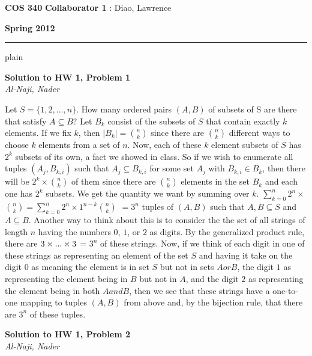 \documentclass[12pt]{article}
\newcommand{\myheader}[4]
{\vspace*{-0.5in}
\noindent
{#1} \hfill {#3}

\noindent
{#2} \hfill {#4}

\noindent
\rule[8pt]{\textwidth}{1pt}

\vspace{1ex} 
}  %
\newcommand{\myalgsheader}[0]
{\myheader
{ {\bf{COS 340}} }
{ {\bf{Spring 2012}} }
{ {\bf{Collaborator 1}} : Diao, Lawrence }
}
\newcommand{\myhwtitle}[3]
{\begin{center}
{\large {\bf Solution to HW {#1}, Problem {#2}}}\\
\medskip 
{\it {#3}} %
\end{center}}
\begin{document}
\myalgsheader

\pagestyle{plain}

\myhwtitle{1}{1}{Al-Naji, Nader}

\bigskip

Let $S = \{1,2, ...,n\}$. How many ordered pairs $(A,B)$ of subsets of S are there that satisfy $A \subseteq B$?
\newline
\newline
Let $B_k$ consist of the subsets of $S$ that contain exactly $k$ elements. If we fix $k$, then $|B_k| = $$n \choose k$ since there are
$n \choose k$ different ways to choose $k$ elements from a set of $n$. Now, each of these $k$ element subsets of $S$ has $2^k$ subsets of its
own, a fact we showed in class. So if we wish to enumerate all tuples $(A_{j}, B_{k,i})$ such that $A_{j} \subseteq B_{k,i}$ for some set $A_j$ with $B_{k,i} \in B_k$, then
there will be $2^k \times $$n \choose k$ of them since there are $n \choose k$ elements in the set $B_k$ and each one has
$2^k$ subsets. We get the quantity we want by summing over $k$. $\sum_{k=0}^n 2^n \times $$n \choose k$$ = $$\sum_{k=0}^n 2^n \times 1^{n-k} $$n \choose k$
$ = $$3^n$ tuples of $(A,B)$ such that $A, B \subseteq S$ and $A \subseteq B$.
\newline
\newline
Another way to think about this is to consider the the set of all strings of length $n$ having the numbers $0$, $1$, or $2$ as digits. By the 
generalized product rule, there are $3 \time 3 \times ... \times 3$ = $3^n$ of these strings. Now, if we think of each digit in one of these
strings as representing an element of the set $S$ and having it take on the digit $0$ as meaning the element is in set $S$ but not in
sets $A or B$, the digit $1$ as representing the element being in $B$ but not in $A$, and the digit $2$ as representing the element being
in both $A and B$, then we see that these strings have a one-to-one mapping to tuples $(A, B)$ from above and, by the bijection rule,
that there are $3^n$ of these tuples.

\newpage
\myhwtitle{1}{2}{Al-Naji, Nader}

\bigskip
\end{document}
